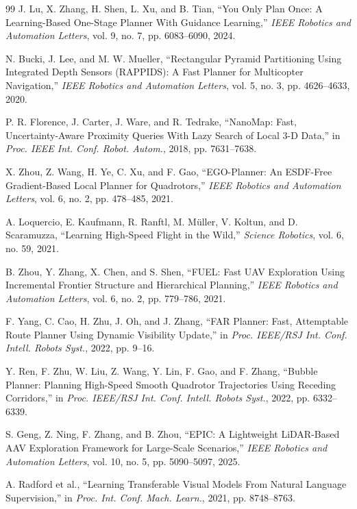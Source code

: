 \documentclass[letterpaper,10pt,conference]{ieeeconf}
\begin{document}
{\footnotesize
\begin{thebibliography}{99}
J. Lu, X. Zhang, H. Shen, L. Xu, and B. Tian,
``You Only Plan Once: A Learning-Based One-Stage Planner With Guidance Learning,''
\emph{IEEE Robotics and Automation Letters}, vol. 9, no. 7,
pp. 6083--6090, 2024.

N. Bucki, J. Lee, and M. W. Mueller,
``Rectangular Pyramid Partitioning Using Integrated Depth Sensors (RAPPIDS): A Fast Planner for Multicopter Navigation,''
\emph{IEEE Robotics and Automation Letters}, vol. 5, no. 3,
pp. 4626--4633, 2020.

P. R. Florence, J. Carter, J. Ware, and R. Tedrake,
``NanoMap: Fast, Uncertainty-Aware Proximity Queries With Lazy Search of Local 3-D Data,''
in \emph{Proc. IEEE Int. Conf. Robot. Autom.}, 2018, pp. 7631--7638.

X. Zhou, Z. Wang, H. Ye, C. Xu, and F. Gao,
``EGO-Planner: An ESDF-Free Gradient-Based Local Planner for Quadrotors,''
\emph{IEEE Robotics and Automation Letters}, vol. 6, no. 2,
pp. 478--485, 2021.

A. Loquercio, E. Kaufmann, R. Ranftl, M. M\"uller, V. Koltun, and D. Scaramuzza,
``Learning High-Speed Flight in the Wild,''
\emph{Science Robotics}, vol. 6, no. 59, 2021.

B. Zhou, Y. Zhang, X. Chen, and S. Shen,
``FUEL: Fast UAV Exploration Using Incremental Frontier Structure and Hierarchical Planning,''
\emph{IEEE Robotics and Automation Letters}, vol. 6, no. 2,
pp. 779--786, 2021.

F. Yang, C. Cao, H. Zhu, J. Oh, and J. Zhang,
``FAR Planner: Fast, Attemptable Route Planner Using Dynamic Visibility Update,''
in \emph{Proc. IEEE/RSJ Int. Conf. Intell. Robots Syst.}, 2022, pp. 9--16.

Y. Ren, F. Zhu, W. Liu, Z. Wang, Y. Lin, F. Gao, and F. Zhang,
``Bubble Planner: Planning High-Speed Smooth Quadrotor Trajectories Using Receding Corridors,''
in \emph{Proc. IEEE/RSJ Int. Conf. Intell. Robots Syst.}, 2022,
pp. 6332--6339.

S. Geng, Z. Ning, F. Zhang, and B. Zhou,
``EPIC: A Lightweight LiDAR-Based AAV Exploration Framework for Large-Scale Scenarios,''
\emph{IEEE Robotics and Automation Letters}, vol. 10, no. 5,
pp. 5090--5097, 2025.

A. Radford et al.,
``Learning Transferable Visual Models From Natural Language Supervision,''
in \emph{Proc. Int. Conf. Mach. Learn.}, 2021, pp. 8748--8763.


\end{thebibliography}}
\end{document}
